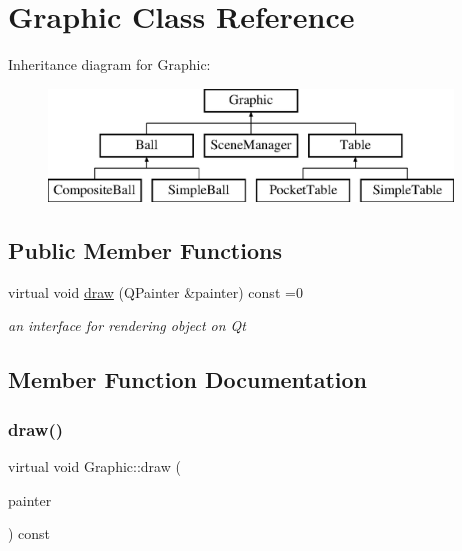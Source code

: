 \hypertarget{class_graphic}{}\section{Graphic Class Reference}
\label{class_graphic}
Inheritance diagram for Graphic\+:\begin{figure}[H]
\begin{center}
\leavevmode
\includegraphics[height=3.000000cm]{class_graphic}
\end{center}
\end{figure}
\subsection*{Public Member Functions}
\begin{DoxyCompactItemize}
\item 
virtual void \mbox{\hyperlink{class_graphic_aed0af75ae3756baeb3fe663ae5f36f29}{draw}} (Q\+Painter \&painter) const =0
\begin{DoxyCompactList}\small\item\em an interface for rendering object on Qt \end{DoxyCompactList}\end{DoxyCompactItemize}


\subsection{Member Function Documentation}
\mbox{\label{class_graphic_aed0af75ae3756baeb3fe663ae5f36f29}} 
\subsubsection{\texorpdfstring{draw()}{draw()}}
{\footnotesize\ttfamily virtual void Graphic\+::draw (\begin{DoxyParamCaption}\item[{Q\+Painter \&}]{painter }\end{DoxyParamCaption}) const\hspace{0.3cm}{\ttfamily [pure virtual]}}




